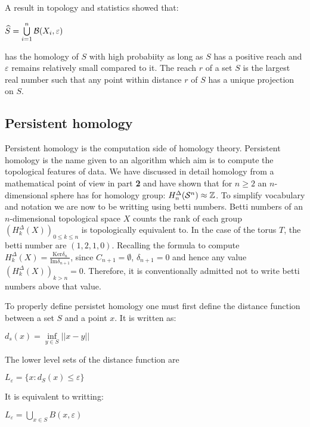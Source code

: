 \documentclass[12pt, a4paper]{article}
\begin{document}
A result in topology and statistics showed that:
\begin{center}
  $\widehat{S} = \bigcup\limits_{i=1}^{n}\mathcal{B}(X_i,\varepsilon)$
\end{center}

has the homology of $S$ with high probabiity as long as $S$ has a positive reach and $\varepsilon$ remains relatively small compared to it. The reach $r$ of a set $S$ is the largest real number such that any point within distance $r$ of $S$ has a unique projection on $S$.

\subsection{Persistent homology}

Persistent homology is the computation side of homology theory. Persistent homology is the name given to an algorithm which aim is to compute the topological features of data. We have discussed in detail homology from a mathematical point of view in part \textbf{2} and have shown that for $n \ge 2$ an $n$-dimensional sphere has for homology group: $H_n^\Delta(\mathcal{S}^n) \approx \mathbb{Z}$. To simplify vocabulary and notation we are now to be writting using betti numbers. Betti numbers of an $n$-dimensional topological space $X$ counts the rank of each group $(H_k^\Delta(X))_{0 \le k \le n}$ is topologically equivalent to. In the case of the torus $T$, the betti number are $(1,2,1,0)$. Recalling the formula to compute $H_k^\Delta(X) = \frac{\text{Ker} \delta_n}{\text{Im} \delta_{n+1}}$, since $C_{n+1} = \emptyset$, $\delta_{n+1} = 0$ and hence any value $(H_k^\Delta(X))_{k > n} = 0$. Therefore, it is conventionally admitted not to write betti numbers above that value. 

To properly define persistet homology one must first define the distance function between a set $S$ and a point $x$. It is written as:
\begin{center}
  $d_s(x) = \inf\limits_{y\in S} ||x-y||$  
\end{center}

The lower level sets of the distance function are

\begin{center}
  $L_\varepsilon = \lbrace x : d_S(x) \le \varepsilon \rbrace$
\end{center}

It is equivalent to writting:

\begin{center}
  $L_\varepsilon = \bigcup\limits_{x \in S} B(x,\varepsilon)$ 
\end{center}
\end{document}
